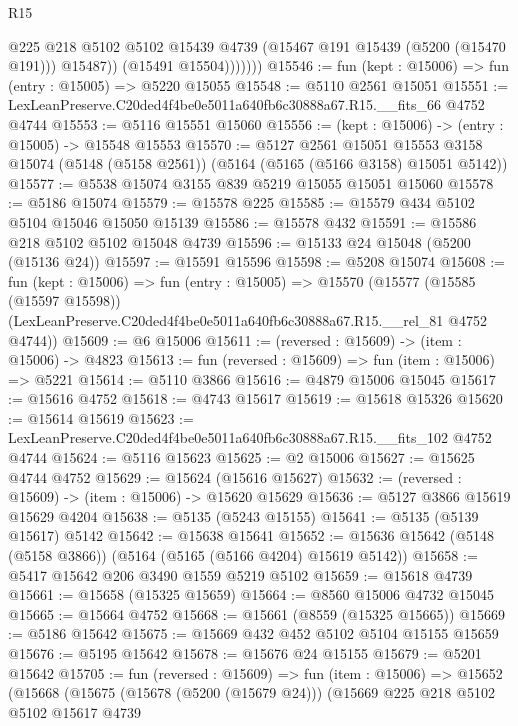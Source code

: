\begin{lexlean}{R15}
\begin{coremodule}
{{{{{{{{{{{                    @225
                    @218
                    @5102
                    @5102
                    @15439
                    @4739
                    (@15467 @191 @15439 (@5200 (@15470 @191)))
                    @15487))
                (@15491 @15504)))))))
@15546 := fun (kept : @15006) => fun (entry : @15005) => @5220 @15055
@15548 := @5110 @2561 @15051
@15551 := LexLeanPreserve.C20ded4f4be0e5011a640fb6c30888a67.R15.__fits_66 @4752 @4744
@15553 := @5116 @15551 @15060
@15556 := (kept : @15006) -> (entry : @15005) -> @15548 @15553
@15570 := @5127
    @2561
    @15051
    @15553
    @3158
    @15074
    (@5148 (@5158 @2561))
    (@5164 (@5165 (@5166 @3158) @15051 @5142))
@15577 := @5538 @15074 @3155 @839 @5219 @15055 @15051 @15060
@15578 := @5186 @15074
@15579 := @15578 @225
@15585 := @15579 @434 @5102 @5104 @15046 @15050 @15139
@15586 := @15578 @432
@15591 := @15586 @218 @5102 @5102 @15048 @4739
@15596 := @15133 @24 @15048 (@5200 (@15136 @24))
@15597 := @15591 @15596
@15598 := @5208 @15074
@15608 := fun (kept : @15006) =>
  fun (entry : @15005) =>
  @15570
    (@15577
      (@15585 (@15597 @15598))
      (LexLeanPreserve.C20ded4f4be0e5011a640fb6c30888a67.R15.__rel_81 @4752 @4744))
@15609 := @6 @15006
@15611 := (reversed : @15609) -> (item : @15006) -> @4823
@15613 := fun (reversed : @15609) => fun (item : @15006) => @5221
@15614 := @5110 @3866
@15616 := @4879 @15006 @15045
@15617 := @15616 @4752
@15618 := @4743 @15617
@15619 := @15618 @15326
@15620 := @15614 @15619
@15623 := LexLeanPreserve.C20ded4f4be0e5011a640fb6c30888a67.R15.__fits_102 @4752 @4744
@15624 := @5116 @15623
@15625 := @2 @15006
@15627 := @15625 @4744 @4752
@15629 := @15624 (@15616 @15627)
@15632 := (reversed : @15609) -> (item : @15006) -> @15620 @15629
@15636 := @5127 @3866 @15619 @15629 @4204
@15638 := @5135 (@5243 @15155)
@15641 := @5135 (@5139 @15617) @5142
@15642 := @15638 @15641
@15652 := @15636 @15642 (@5148 (@5158 @3866)) (@5164 (@5165 (@5166 @4204) @15619 @5142))
@15658 := @5417 @15642 @206 @3490 @1559 @5219 @5102
@15659 := @15618 @4739
@15661 := @15658 (@15325 @15659)
@15664 := @8560 @15006 @4732 @15045
@15665 := @15664 @4752
@15668 := @15661 (@8559 (@15325 @15665))
@15669 := @5186 @15642
@15675 := @15669 @432 @452 @5102 @5104 @15155 @15659
@15676 := @5195 @15642
@15678 := @15676 @24 @15155
@15679 := @5201 @15642
@15705 := fun (reversed : @15609) =>
  fun (item : @15006) =>
  @15652
    (@15668
      (@15675
        (@15678 (@5200 (@15679 @24)))
        (@15669
          @225
          @218
          @5102
          @5102
          @15617
          @4739
}}}}}}}}}}}
\end{coremodule}
\end{lexlean}
